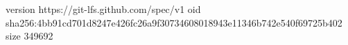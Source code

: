version https://git-lfs.github.com/spec/v1
oid sha256:4bb91cd701d8247e426fc26a9f30734608018943e11346b742e540f69725b402
size 349692
